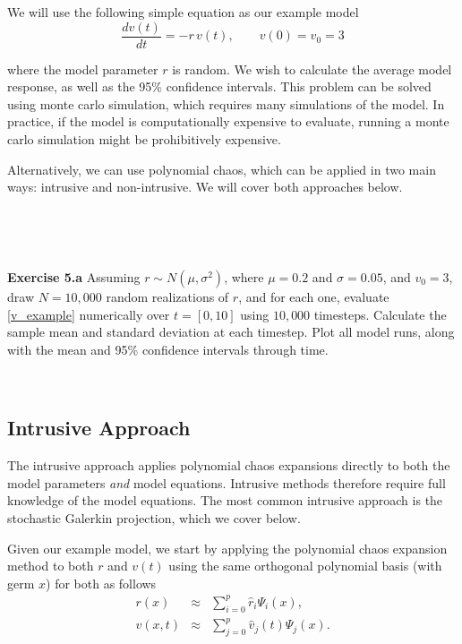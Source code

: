 \documentclass[11pt]{article}
\numberwithin{equation}{section}
\begin{document}
We will use the following simple equation as our example model
\begin{equation}
\frac{dv(t)}{dt} = - r \, v(t), \qquad v(0) = v_0 = 3 \label{v_example}
\end{equation}

where the model parameter $r$ is random. We wish to calculate the average model response, as well as the 95\% confidence intervals. This problem can be solved using monte carlo simulation, which requires many simulations of the model. In practice, if the model is computationally expensive to evaluate, running a monte carlo simulation might be prohibitively expensive.

\qquad Alternatively, we can use polynomial chaos, which can be applied in two main ways: intrusive and non-intrusive. We will cover both approaches below.




\

\

\textbf{Exercise 5.a} Assuming $r \sim N(\mu, \sigma^2)$, where $\mu = 0.2$ and $\sigma = 0.05$, and $v_0 = 3$, draw $N = 10,000$ random realizations of $r$, and for each one, evaluate \eqref{v_example} numerically over $t = [0, 10]$ using $10,000$ timesteps. Calculate the sample mean and standard deviation at each timestep. Plot all model runs, along with the mean and 95\% confidence intervals through time.

\







\subsection{Intrusive Approach}

The intrusive approach applies polynomial chaos expansions directly to both the model parameters {\em and} model equations. Intrusive methods therefore require full knowledge of the model equations. The most common intrusive approach is the stochastic Galerkin projection, which we cover below.

\qquad Given our example model, we start by applying the polynomial chaos expansion method to both $r$ and $v(t)$ using the same orthogonal polynomial basis (with germ $x$) for both as follows
\begin{eqnarray}
r(x) & \approx & \sum_{i=0}^p \hat{r}_i \Psi_i(x), \label{r_pce} \\
v(x, t) & \approx & \sum_{j=0}^p \hat{v}_j(t) \Psi_j(x). \label{v_pce}
\end{eqnarray}
\end{document}
